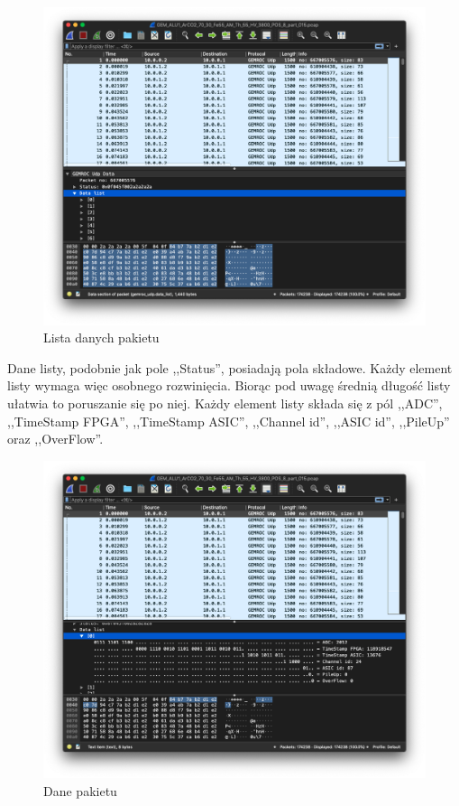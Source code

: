 \documentclass[a4paper, 12pt, twoside, openright]{article}
\begin{document}
		\begin{figure}[H]
			\centering
				\includegraphics[width=1.0\textwidth]{img/screenshot_dissector_data_list.png}
			\caption{Lista danych pakietu}
			\label{fig:dis_data_list}
		\end{figure}

	Dane listy, podobnie jak pole ,,Status'', posiadają pola składowe. Każdy element listy wymaga więc osobnego rozwinięcia. Biorąc pod uwagę średnią długość
	listy ułatwia to poruszanie się po niej. Każdy element listy składa się z pól ,,ADC'', ,,TimeStamp FPGA'', ,,TimeStamp ASIC'', ,,Channel id'', ,,ASIC id'',
	,,PileUp'' oraz ,,OverFlow''.

		\begin{figure}[H]
			\centering
				\includegraphics[width=1.0\textwidth]{img/screenshot_dissector_data.png}
			\caption{Dane pakietu}
			\label{fig:dis_data}
		\end{figure}
\end{document}
